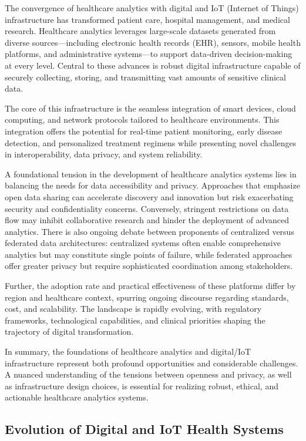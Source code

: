 \documentclass[sigconf]{acmart}
\begin{document}
The convergence of healthcare analytics with digital and IoT (Internet of Things) infrastructure has transformed patient care, hospital management, and medical research. Healthcare analytics leverages large-scale datasets generated from diverse sources—including electronic health records (EHR), sensors, mobile health platforms, and administrative systems—to support data-driven decision-making at every level. Central to these advances is robust digital infrastructure capable of securely collecting, storing, and transmitting vast amounts of sensitive clinical data.

The core of this infrastructure is the seamless integration of smart devices, cloud computing, and network protocols tailored to healthcare environments. This integration offers the potential for real-time patient monitoring, early disease detection, and personalized treatment regimens while presenting novel challenges in interoperability, data privacy, and system reliability.

A foundational tension in the development of healthcare analytics systems lies in balancing the needs for data accessibility and privacy. Approaches that emphasize open data sharing can accelerate discovery and innovation but risk exacerbating security and confidentiality concerns. Conversely, stringent restrictions on data flow may inhibit collaborative research and hinder the deployment of advanced analytics. There is also ongoing debate between proponents of centralized versus federated data architectures: centralized systems often enable comprehensive analytics but may constitute single points of failure, while federated approaches offer greater privacy but require sophisticated coordination among stakeholders.

Further, the adoption rate and practical effectiveness of these platforms differ by region and healthcare context, spurring ongoing discourse regarding standards, cost, and scalability. The landscape is rapidly evolving, with regulatory frameworks, technological capabilities, and clinical priorities shaping the trajectory of digital transformation.

In summary, the foundations of healthcare analytics and digital/IoT infrastructure represent both profound opportunities and considerable challenges. A nuanced understanding of the tensions between openness and privacy, as well as infrastructure design choices, is essential for realizing robust, ethical, and actionable healthcare analytics systems.

\subsection{Evolution of Digital and IoT Health Systems}
\end{document}
